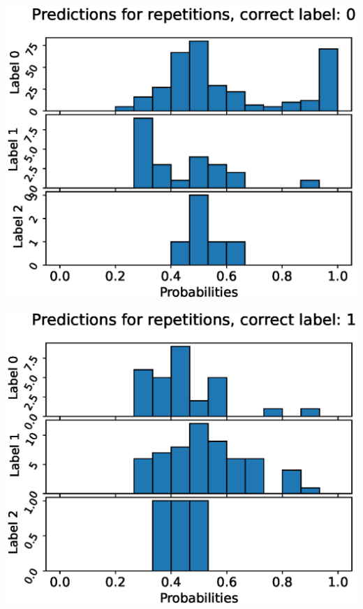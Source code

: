 \begin{center}
\begin{minipage}{0.33\textwidth}
  \includegraphics[width=\textwidth]{files/figs/app/hists/kmfp/pr0.eps}
\end{minipage}%
\begin{minipage}{0.33\textwidth}
  \includegraphics[width=\textwidth]{files/figs/app/hists/kmfp/pr1.eps}
\end{minipage}%
\begin{minipage}{0.33\textwidth}

\end{minipage}
\end{center}
